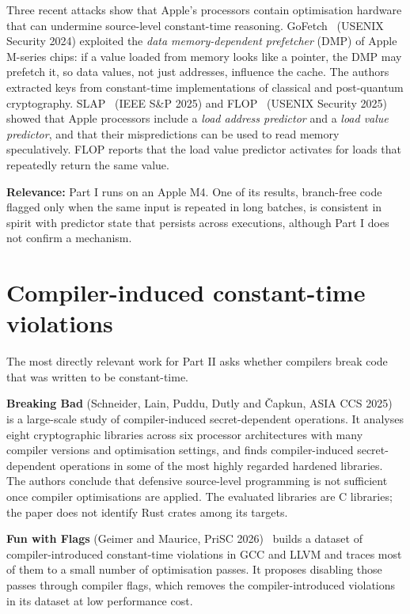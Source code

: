 Three recent attacks show that Apple's processors contain optimisation hardware that can undermine source-level constant-time reasoning. GoFetch~\cite{gofetch} (USENIX Security 2024) exploited the \emph{data memory-dependent prefetcher} (DMP) of Apple M-series chips: if a value loaded from memory looks like a pointer, the DMP may prefetch it, so data values, not just addresses, influence the cache. The authors extracted keys from constant-time implementations of classical and post-quantum cryptography. SLAP~\cite{slap} (IEEE S\&P 2025) and FLOP~\cite{flop} (USENIX Security 2025) showed that Apple processors include a \emph{load address predictor} and a \emph{load value predictor}, and that their mispredictions can be used to read memory speculatively. FLOP reports that the load value predictor activates for loads that repeatedly return the same value.

\textbf{Relevance:} Part I runs on an Apple M4. One of its results, branch-free code flagged only when the same input is repeated in long batches, is consistent in spirit with predictor state that persists across executions, although Part I does not confirm a mechanism.

\section{Compiler-induced constant-time violations}
\label{sec:lit_compilers}

The most directly relevant work for Part II asks whether compilers break code that was written to be constant-time.

\textbf{Breaking Bad} (Schneider, Lain, Puddu, Dutly and Čapkun, ASIA CCS 2025)~\cite{breakingbad} is a large-scale study of compiler-induced secret-dependent operations. It analyses eight cryptographic libraries across six processor architectures with many compiler versions and optimisation settings, and finds compiler-induced secret-dependent operations in some of the most highly regarded hardened libraries. The authors conclude that defensive source-level programming is not sufficient once compiler optimisations are applied. The evaluated libraries are C libraries; the paper does not identify Rust crates among its targets.

\textbf{Fun with Flags} (Geimer and Maurice, PriSC 2026)~\cite{funwithflags} builds a dataset of compiler-introduced constant-time violations in GCC and LLVM and traces most of them to a small number of optimisation passes. It proposes disabling those passes through compiler flags, which removes the compiler-introduced violations in its dataset at low performance cost.

